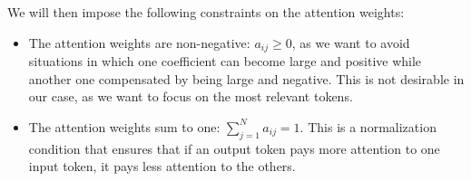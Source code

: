 \begin{table}[htp] %
\end{table}

We will then impose the following constraints on the attention weights:

\begin{itemize}
    \item The attention weights are non-negative: $a_{ij} \geq 0$, as we want to avoid situations in which one coefficient can become large and positive while another one compensated by being large and negative. This is not desirable in our case, as we want to focus on the most relevant tokens.
    \item The attention weights sum to one: $\sum_{j=1}^N a_{ij} = 1$. This is a normalization condition that ensures that if an output token pays more attention to one input token, it pays less attention to the others. 
\end{itemize}

